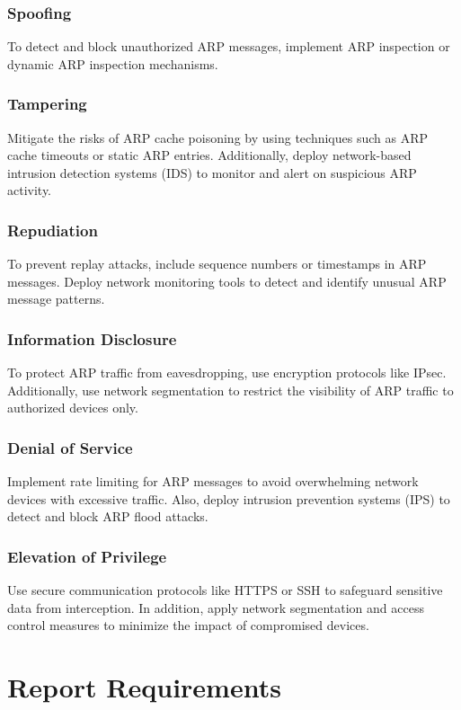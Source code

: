 \documentclass{article}
\begin{document}
\subsubsection{Spoofing}  
To detect and block unauthorized ARP messages, implement ARP inspection or dynamic ARP inspection mechanisms.

\subsubsection{Tampering}  
Mitigate the risks of ARP cache poisoning by using techniques such as ARP cache timeouts or static ARP entries. Additionally, deploy network-based intrusion detection systems (IDS) to monitor and alert on suspicious ARP activity.

\subsubsection{Repudiation}  
To prevent replay attacks, include sequence numbers or timestamps in ARP messages. Deploy network monitoring tools to detect and identify unusual ARP message patterns.

\subsubsection{Information Disclosure}  
To protect ARP traffic from eavesdropping, use encryption protocols like IPsec. Additionally, use network segmentation to restrict the visibility of ARP traffic to authorized devices only.

\subsubsection{Denial of Service}  
Implement rate limiting for ARP messages to avoid overwhelming network devices with excessive traffic. Also, deploy intrusion prevention systems (IPS) to detect and block ARP flood attacks.

\subsubsection{Elevation of Privilege}  
Use secure communication protocols like HTTPS or SSH to safeguard sensitive data from interception. In addition, apply network segmentation and access control measures to minimize the impact of compromised devices.

\label{subsubsec:arp-mit}

\section*{Report Requirements}
\end{document}
